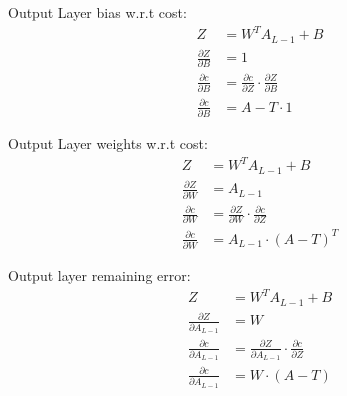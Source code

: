 Output Layer bias w.r.t cost:
\begin{equation}
    \begin{aligned}
        Z &= W^{T}A_{L-1} + B\\
        \frac{\partial Z}{\partial B} &= 1\\[2em]
        \frac{\partial c}{\partial B} &= \frac{\partial c}{\partial Z} \cdot \frac{\partial Z}{\partial B}\\
        \frac{\partial c}{\partial B} &= A - T \cdot 1
    \end{aligned}
\end{equation}

Output Layer weights w.r.t cost:
\begin{equation}
    \begin{aligned}
        Z &= W^{T}A_{L-1} + B\\
        \frac{\partial Z}{\partial W} &= A_{L-1}\\[2em]
        \frac{\partial c}{\partial W} &= \frac{\partial Z}{\partial W} \cdot \frac{\partial c}{\partial Z} \\
        \frac{\partial c}{\partial W} &= A_{L-1} \cdot (A - T)^{T}
    \end{aligned}
\end{equation}

Output layer remaining error:
\begin{equation}
    \begin{aligned}
        Z &= W^{T}A_{L-1} + B\\
        \frac{\partial Z}{\partial A_{L-1}} &= W\\[2em]
        \frac{\partial c}{\partial A_{L-1}} &= \frac{\partial Z}{\partial A_{L-1}} \cdot \frac{\partial c}{\partial Z}\\
        \frac{\partial c}{\partial A_{L-1}} &= W \cdot (A - T)
    \end{aligned}
\end{equation}

